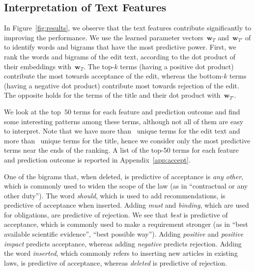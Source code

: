 \subsection{Interpretation of Text Features}
\label{sec:intertext}

In Figure~\ref{fig:results}, we observe that the text features contribute significantly to improving the performance.
We use the learned parameter vectors~$\boldsymbol{w}_T$ and~$\boldsymbol{w}_{T'}$ of  to identify words and bigrams that have the most predictive power.
First, we rank the words and bigrams of the edit text, according to the dot product of their embeddings with~$\boldsymbol{w}_T$.
The top-$k$ terms (having a positive dot product) contribute the most towards acceptance of the edit, whereas the bottom-$k$ terms (having a negative dot product) contribute most towards rejection of the edit.
The opposite holds for the terms of the title and their dot product with~$\boldsymbol{w}_{T'}$.

We look at the top~$50$ terms for each feature and prediction outcome and find some interesting patterns among these terms, although not all of them are easy to interpret.
Note that we have more than~ unique terms for the edit text and more than~ unique terms for the title, hence we consider only the most predictive terms near the ends of the ranking.
A list of the top-50 terms for each feature and prediction outcome is reported in Appendix~\ref{app:accept}.

One of the bigrams that, when deleted, is predictive of acceptance is \textit{any other}, which is commonly used to widen the scope of the law (as in ``contractual or any other duty'').
The word \textit{should}, which is used to add recommendations, is predictive of acceptance when inserted.
Adding \textit{must} and \textit{binding}, which are used for obligations, are predictive of rejection.
We see that \textit{best} is predictive of acceptance, which is commonly used to make a requirement stronger (as in ``best available scientific evidence'', ``best possible way'').
Adding \textit{positive} and \textit{positive impact} predicts acceptance, whereas adding \textit{negative} predicts rejection.
Adding the word \textit{inserted}, which commonly refers to inserting new articles in existing laws, is predictive of acceptance, whereas \textit{deleted} is predictive of rejection.

